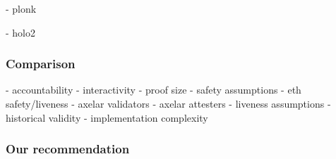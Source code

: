 - plonk

- holo2

\subsubsection{Comparison}
         - accountability
         - interactivity
         - proof size 
         - safety assumptions
             - eth safety/liveness
             - axelar validators 
             - axelar attesters 
         - liveness assumptions
         - historical validity
         - implementation complexity

\subsubsection{Our recommendation}

